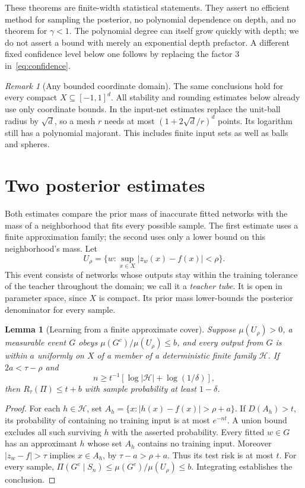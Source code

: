 \documentclass[11pt]{article}
\newtheorem{lemma}[theorem]{Lemma}\newtheorem{corollary}[theorem]{Corollary}
\theoremstyle{remark}\newtheorem{remark}[theorem]{Remark}
\begin{document}
These theorems are finite-width statistical statements. They assert no
efficient method for sampling the posterior, no polynomial dependence on
depth, and no theorem for $\gamma<1$. The polynomial degree can itself grow
quickly with depth; we do not assert a bound with merely an exponential
depth prefactor. A different fixed confidence level
below one follows by replacing the factor $3$ in~\eqref{eq:confidence}.

\begin{remark}[Any bounded coordinate domain]\label{rem:cube}
The same conclusions hold for every compact $X\subseteq[-1,1]^d$.
All stability and rounding estimates below already use only coordinate
bounds. In the input-net estimates replace the unit-ball radius by
$\sqrt d$, so a mesh $r$ needs at most $(1+2\sqrt d/r)^d$ points.
Its logarithm still has a polynomial majorant. This includes finite input
sets as well as balls and spheres.
\end{remark}

\section{Two posterior estimates}\label{sec:posterior}
Both estimates compare the prior mass of inaccurate fitted networks
with the mass of a neighborhood that fits every possible sample.
The first estimate uses a finite approximation family; the second uses
only a lower bound on this neighborhood's mass.
Let
\begin{equation}\label{eq:tube}
 U_\rho=\{w:\sup_{x\in X}|z_w(x)-f(x)|<\rho\}.
\end{equation}
This event consists of networks whose outputs stay within the training
tolerance of the teacher throughout the domain; we call it a
\emph{teacher tube}. It is open in parameter space, since $X$ is compact.
Its prior mass lower-bounds the posterior denominator for every sample.

\begin{lemma}[Learning from a finite approximate cover]\label{lem:posterior}
Suppose $\mu(U_\rho)>0$, a measurable event $G$ obeys
$\mu(G^c)/\mu(U_\rho)\leq b$, and every output from $G$ is within
$a$ uniformly on $X$ of a member of a deterministic finite family
$\mathcal H$. If $2a<\tau-\rho$ and
\[
 n\geq t^{-1}[\log|\mathcal H|+\log(1/\delta)],
\]
then $R_\tau(\Pi)\leq t+b$ with sample probability at least $1-\delta$.
\end{lemma}
\begin{proof}
For each $h\in\mathcal H$, set
$A_h=\{x:|h(x)-f(x)|>\rho+a\}$. If $D(A_h)>t$, its probability
of containing no training input is at most $e^{-nt}$. A union bound
excludes all such surviving $h$ with the asserted probability.
Every fitted $w\in G$ has an approximant $h$ whose set $A_h$ contains
no training input. Moreover $|z_w-f|>\tau$ implies $x\in A_h$,
by $\tau-a>\rho+a$. Thus its test risk is at most $t$.
For every sample, $\Pi(G^c\mid S_n)\leq\mu(G^c)/\mu(U_\rho)\leq b$.
Integrating establishes the conclusion.
\end{proof}
\end{document}
